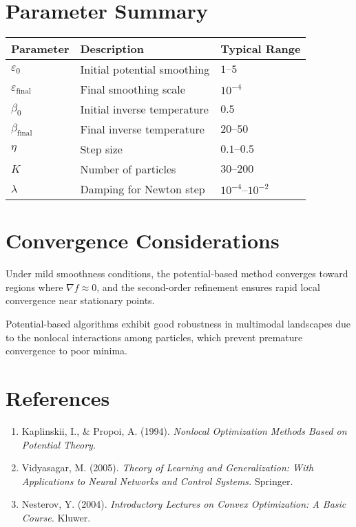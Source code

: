 \documentclass[12pt]{article}
\begin{document}
\section{Parameter Summary}

\begin{center}
\begin{tabular}{l l l}
\hline
Parameter & Description & Typical Range \\
\hline
$\varepsilon_0$ & Initial potential smoothing & $1 \text{--} 5$ \\
$\varepsilon_\text{final}$ & Final smoothing scale & $10^{-4}$ \\
$\beta_0$ & Initial inverse temperature & $0.5$ \\
$\beta_\text{final}$ & Final inverse temperature & $20\text{--}50$ \\
$\eta$ & Step size & $0.1\text{--}0.5$ \\
$K$ & Number of particles & $30\text{--}200$ \\
$\lambda$ & Damping for Newton step & $10^{-4}\text{--}10^{-2}$ \\
\hline
\end{tabular}
\end{center}

\section{Convergence Considerations}

Under mild smoothness conditions, the potential-based method converges toward regions where $\nabla f \approx 0$, and the second-order refinement ensures rapid local convergence near stationary points.

Potential-based algorithms exhibit good robustness in multimodal landscapes due to the nonlocal interactions among particles, which prevent premature convergence to poor minima.

\section{References}

\begin{enumerate}
    \item Kaplinskii, I., \& Propoi, A. (1994). \emph{Nonlocal Optimization Methods Based on Potential Theory.}
    \item Vidyasagar, M. (2005). \emph{Theory of Learning and Generalization: With Applications to Neural Networks and Control Systems.} Springer.
    \item Nesterov, Y. (2004). \emph{Introductory Lectures on Convex Optimization: A Basic Course.} Kluwer.
\end{enumerate}
\end{document}
